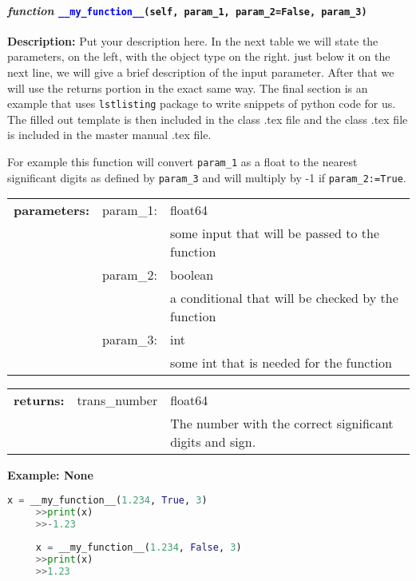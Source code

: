 


\paragraph{\textit{function} \textcolor{blue}{\texttt{\_\_my\_function\_\_}}\texttt{(self, param\_1, param\_2=False, param\_3)}}\hfill\break
\noindent \textbf{Description:} Put your description here. In the next table we will state the parameters, on the left, with the object type on the right. just below it on the next line, we will give a brief description of the input parameter. After that we will use the returns portion in the exact same way. The final section is an example that uses \texttt{lstlisting} package to write snippets of python code for us. The filled out template is then included in the class .tex file and the class .tex file is included in the master manual .tex file.

For example this function will convert \texttt{param\_1} as a float to the nearest significant digits as defined by \texttt{param\_3} and will multiply by -1 if \texttt{param\_2:=True}. 

\begin{tabular}{r r l }
	\textbf{parameters:}	& param\_1: & float64\\
	&  & some input that will be passed to the function\\
	& param\_2:& boolean\\
	&& a conditional that will be checked by the function\\
	& param\_3:& int\\
	&& some int that is needed for the function	
\end{tabular}

\begin{tabular}{l c l}
	\textbf{returns:} & trans\_number & float64\\
	& & The number with the correct significant digits and sign. 
\end{tabular}

\textbf{Example: None}
	\begin{lstlisting}[language=Python]
	 x = __my_function__(1.234, True, 3)
	 >>print(x)
	 >>-1.23
	 
	 x = __my_function__(1.234, False, 3)
	 >>print(x)
	 >>1.23
	 \end{lstlisting}
